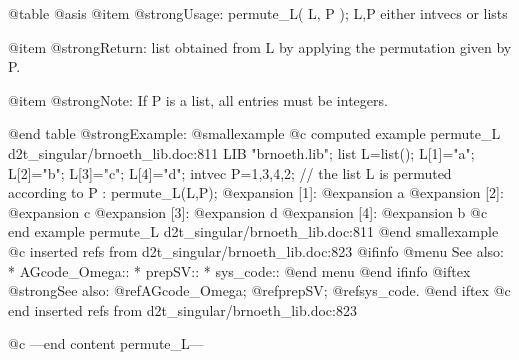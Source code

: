 @table @asis
@item @strong{Usage:}
permute_L( L, P ); L,P either intvecs or lists

@item @strong{Return:}
list obtained from L by applying the permutation given by P.

@item @strong{Note:}
If P is a list, all entries must be integers.

@end table
@strong{Example:}
@smallexample
@c computed example permute_L d2t_singular/brnoeth_lib.doc:811 
LIB "brnoeth.lib";
list L=list();
L[1]="a";
L[2]="b";
L[3]="c";
L[4]="d";
intvec P=1,3,4,2;
// the list L is permuted according to P :
permute_L(L,P);
@expansion{} [1]:
@expansion{}    a
@expansion{} [2]:
@expansion{}    c
@expansion{} [3]:
@expansion{}    d
@expansion{} [4]:
@expansion{}    b
@c end example permute_L d2t_singular/brnoeth_lib.doc:811
@end smallexample
@c inserted refs from d2t_singular/brnoeth_lib.doc:823
@ifinfo
@menu
See also:
* AGcode_Omega::
* prepSV::
* sys_code::
@end menu
@end ifinfo
@iftex
@strong{See also:}
@ref{AGcode_Omega};
@ref{prepSV};
@ref{sys_code}.
@end iftex
@c end inserted refs from d2t_singular/brnoeth_lib.doc:823

@c ---end content permute_L---
